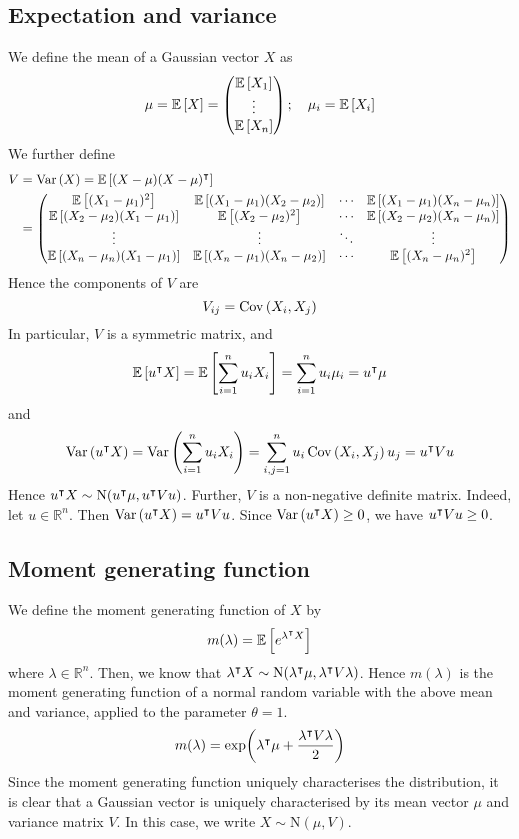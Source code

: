 \subsection{Expectation and variance}
We define the mean of a Gaussian vector \(X\) as
\[
	\mu = \mathbb{E}\left[{X}\right] = \begin{pmatrix}
		\mathbb{E}\left[{X_1}\right] \\ \vdots \\ \mathbb{E}\left[{X_n}\right]
	\end{pmatrix};\quad \mu_i = \mathbb{E}\left[{X_i}\right]
\]
We further define
\begin{align*}
	V & = \operatorname{Var}\left({X}\right) = \mathbb{E}\left[{(X - \mu) (X - \mu)^\intercal}\right] \\
	  & = \begin{pmatrix}
		\mathbb{E}\left[{(X_1 - \mu_1)^2}\right]            & \mathbb{E}\left[{(X_1 - \mu_1)(X_2 - \mu_2)}\right] & \cdots & \mathbb{E}\left[{(X_1 - \mu_1)(X_n - \mu_n)}\right] \\
		\mathbb{E}\left[{(X_2 - \mu_2)(X_1 - \mu_1)}\right] & \mathbb{E}\left[{(X_2 - \mu_2)^2}\right]            & \cdots & \mathbb{E}\left[{(X_2 - \mu_2)(X_n - \mu_n)}\right] \\
		\vdots                              & \vdots                              & \ddots & \vdots                              \\
		\mathbb{E}\left[{(X_n - \mu_n)(X_1 - \mu_1)}\right] & \mathbb{E}\left[{(X_n - \mu_1)(X_n - \mu_2)}\right] & \cdots & \mathbb{E}\left[{(X_n - \mu_n)^2}\right]
	\end{pmatrix}
\end{align*}
Hence the components of \(V\) are
\[
	V_{ij} = \operatorname{Cov}\left({X_i, X_j}\right)
\]
In particular, \(V\) is a symmetric matrix, and
\[
	\mathbb{E}\left[{u^\intercal X}\right] = \mathbb{E}\left[{\sum_{i=1}^n u_i X_i}\right] = \sum_{i=1}^n u_i \mu_i = u^\intercal \mu
\]
and
\[
	\operatorname{Var}\left({u^\intercal X}\right) = \operatorname{Var}\left({\sum_{i=1}^n u_i X_i}\right) = \sum_{i,j = 1}^n u_i \operatorname{Cov}\left({X_i, X_j}\right) u_j = u^\intercal V u
\]
Hence \(u^\intercal X \sim \mathrm{N}(u^\intercal \mu, u^\intercal V u)\).
Further, \(V\) is a non-negative definite matrix.
Indeed, let \(u \in \mathbb R^n\).
Then \(\operatorname{Var}\left({u^\intercal X}\right) = u^\intercal V u\).
Since \(\operatorname{Var}\left({u^\intercal X}\right) \geq 0\), we have \(u^\intercal V u \geq 0\).

\subsection{Moment generating function}
We define the moment generating function of \(X\) by
\[
	m(\lambda) = \mathbb{E}\left[{e^{\lambda^\intercal X}}\right]
\]
where \(\lambda \in \mathbb R^n\).
Then, we know that \(\lambda^\intercal X \sim \mathrm{N}(\lambda^\intercal \mu, \lambda^\intercal V \lambda)\).
Hence \(m(\lambda)\) is the moment generating function of a normal random variable with the above mean and variance, applied to the parameter \(\theta = 1\).
\[
	m(\lambda) = \exp(\lambda^\intercal \mu + \frac{\lambda^\intercal V\lambda}{2})
\]
Since the moment generating function uniquely characterises the distribution, it is clear that a Gaussian vector is uniquely characterised by its mean vector \(\mu\) and variance matrix \(V\).
In this case, we write \(X \sim \mathrm{N}(\mu, V)\).

